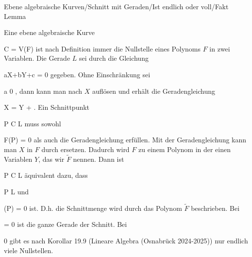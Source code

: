 {Ebene algebraische Kurven/Schnitt mit Geraden/Ist endlich oder voll/Fakt}
{Lemma}
{}
{
\faktzusatz {}
\faktzusatz {}

}
{
Eine ebene algebraische Kurve

\mavergleichskette
{\vergleichskette
{C
}
{ = }{ V(F)
}
{  }{
}
{    }{
}
{   }{
}
}
{}{}{}
ist nach Definition immer die Nullstelle eines Polynoms $F$ in zwei Variablen. Die Gerade $L$ sei durch die Gleichung

\mavergleichskette
{\vergleichskette
{ aX+bY+c
}
{ = }{ 0
}
{  }{
}
{    }{
}
{   }{
}
}
{}{}{}
gegeben. Ohne Einschränkung sei

\mavergleichskette
{\vergleichskette
{a
}
{ \neq }{ 0
}
{  }{
}
{    }{
}
{   }{
}
}
{}{}{,}
dann kann man nach $X$ auflösen und erhält die Geradengleichung

\mavergleichskette
{\vergleichskette
{X
}
{ = }{ \alpha Y + \beta
}
{  }{
}
{    }{
}
{   }{
}
}
{}{}{.}
Ein Schnittpunkt

\mavergleichskette
{\vergleichskette
{P
}
{ \in }{ C \cap L
}
{  }{
}
{    }{
}
{   }{
}
}
{}{}{}
muss sowohl

\mavergleichskette
{\vergleichskette
{ F(P)
}
{ = }{ 0
}
{  }{
}
{    }{
}
{   }{
}
}
{}{}{}
als auch die Geradengleichung erfüllen. Mit der Geradengleichung kann man $X$ in $F$ durch
 ersetzen. Dadurch wird $F$ zu einem Polynom in der einen Variablen $Y$, das wir $\tilde{F}$ nennen. Dann ist

\mavergleichskette
{\vergleichskette
{P
}
{ \in }{ C \cap L
}
{  }{
}
{    }{
}
{   }{
}
}
{}{}{}
äquivalent dazu, dass

\mavergleichskette
{\vergleichskette
{P
}
{ \in }{ L
}
{  }{
}
{    }{
}
{   }{
}
}
{}{}{}
und

\mavergleichskette
{\vergleichskette
{ (P)
}
{ = }{ 0
}
{  }{
}
{    }{
}
{   }{
}
}
{}{}{}
ist. D.h. die Schnittmenge wird durch das Polynom $\tilde{F}$ beschrieben. Bei

\mavergleichskette
{\vergleichskette
{ 
}
{ = }{ 0
}
{  }{
}
{    }{
}
{   }{
}
}
{}{}{}
ist die ganze Gerade der Schnitt. Bei

\mavergleichskette
{\vergleichskette
{ 
}
{ \neq }{ 0
}
{  }{
}
{    }{
}
{   }{
}
}
{}{}{}
gibt es nach
Korollar 19.9 (Lineare Algebra (Osnabrück 2024-2025))
nur endlich viele Nullstellen.


}


